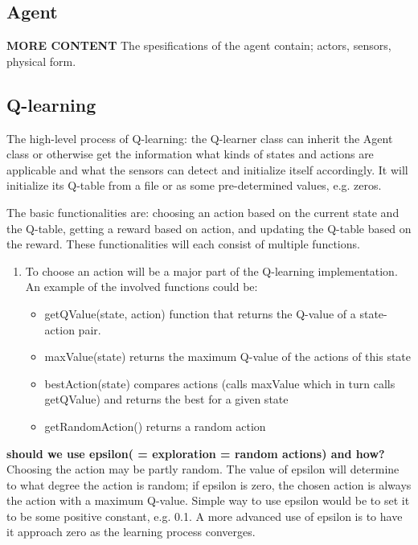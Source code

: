 \documentclass{article}
\begin{document}
\subsection{Agent}
\textbf{MORE CONTENT}
The spesifications of the agent contain; actors, sensors, physical form.


\subsection{Q-learning}
The high-level process of Q-learning:
the Q-learner class can inherit the Agent class or otherwise get the information
what kinds of states and actions are applicable and what the sensors can detect
and initialize itself accordingly. It will initialize its Q-table from a file or
as some pre-determined values, e.g. zeros.

The basic functionalities are: choosing an action based on the current state and
the Q-table, getting a reward based on action, and updating the Q-table based on
the reward. These functionalities will each consist of multiple functions.
\begin{enumerate}
\item To choose an action will be a major part of the Q-learning implementation. An
      example of the involved functions could be:
    \begin{itemize}
    \item getQValue(state, action) function that returns the Q-value of a state-action pair.
    \item maxValue(state) returns the maximum Q-value of the actions of this state
    \item bestAction(state) compares actions (calls maxValue which in turn calls getQValue)
      and returns the best for a given state
    \item getRandomAction() returns a random action
    \end{itemize}
\end{enumerate}

\textbf{should we use epsilon( = exploration = random actions) and how?}
Choosing the action may be partly random. The value of epsilon will determine to
what degree the action is random; if epsilon is zero, the chosen action is always
the action with a maximum Q-value. Simple way to use epsilon would be to set it
to be some positive constant, e.g. 0.1. A more advanced use of epsilon is to have
it approach zero as the learning process converges.
\end{document}
